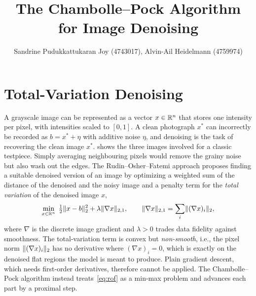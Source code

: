 \documentclass{article}
\title{The Chambolle--Pock Algorithm for Image Denoising}
\author{Sandrine Pudukkattukaran Joy (4743017), Alvin-Ail Heidelmann (4759974)}
\begin{document}
\maketitle

\section{Total-Variation Denoising}
\label{section:problem}
A grayscale image can be represented as a vector $x \in \mathbb{R}^n$ that stores one intensity per pixel, with intensities scaled to $[0, 1]$.
A clean photograph $x^*$ can incorrectly be recorded as $b = x^* + \eta$ with additive noise $\eta$, and denoising is the task of recovering the clean image $x^*$.
 shows the three images involved for a classic testpiece.
Simply averaging neighbouring pixels would remove the grainy noise but also wash out the edges.
The Rudin--Osher--Fatemi approach proposes finding a suitable denoised version of an image by optimizing a weighted sum of the distance of the denoised and the noisy image and a penalty term for the \emph{total variation} of the denoised image $x$,
\begin{equation}
	\label{eq:rof}
	\min_{x \in \mathbb{R}^n} \; \tfrac12 \lVert x - b\rVert_2^2 + \lambda \lVert\nabla x\rVert_{2,1},
	\qquad
	\lVert\nabla x\rVert_{2,1} = \sum_i \lVert(\nabla x)_i\rVert_2,
\end{equation}
where $\nabla$ is the discrete image gradient and $\lambda > 0$ trades data fidelity against smoothness.
The total-variation term is convex but \emph{non-smooth}, i.e., the pixel norm $\lVert(\nabla x)_i\rVert_2$ has no derivative where $(\nabla x)_i = 0$, which is exactly on the denoised flat regions the model is meant to produce.
Plain gradient descent, which needs first-order derivatives, therefore cannot be applied.
The Chambolle--Pock algorithm instead treats~\eqref{eq:rof} as a min-max problem and advances each part by a proximal step.
\end{document}
